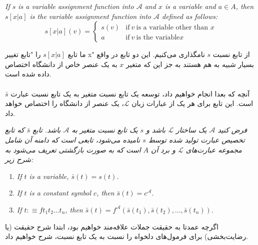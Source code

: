 \documentclass[10pt,a4paper]{article}
\newcommand{\curveL}{\mathcal{L}}
\newcommand{\curveA}{\mathcal{A}}
\begin{document}
                    \begin{define}
                        \textit{If $s$ is a variable assignment function into $\curveA$ and $x$ is a variable and $a\in A$, then $s[x|a]$ is the variable assignment function into $\curveA$ defined as follows:}
                        \begin{equation}
                            s[x|a](v) = \left\{
                                \begin{matrix}
                                    s(v) & \text{if} \ v \ \text{is a variable other than }x\\
                                    a & \text{if} \ v \ \text{is the variable} x 
                                \end{matrix}\right.
                        \end{equation}
                    \end{define} 
                 ما تابع $s[x|a]$ را "تابع تغییر x" از تابع نسبت $s$ نامگذاری می‌کنیم. این دو تابع در واقع بسیار شبیه به هم هستند به جز این که متغیر $x$ به یک عنصر خاص از دانشگاه اختصاص داده شده است.
                    \\
                    \\
                   آنچه که بعدا انجام خواهیم داد، توسعه یک تابع نسبت متغیر به یک تابع نسبت عبارت $\bar{s}$ است. این تابع برای هر یک از عبارات زبان $\curveL$، یک عنصر از دانشگاه را اختصاص خواهد داد.
                    \begin{define}
                        \textit{فرض کنید $\curveA$ یک ساختار $\curveL$ باشد و $s$ یک تابع نسبت متغیر به $\curveA$ باشد. تابع $\bar{s}$ که تابع تخصیص عبارت تولید شده توسط $s$ نامیده می‌شود، تابعی است که دامنه آن شامل مجموعه عبارت‌های $\curveL$ و برد آن $A$ است که به صورت بازگشتی تعریف می‌شود به شرح زیر:}
                        \begin{enumerate}
                            \item \textit{If $t$ is a variable, $\bar s(t) = s(t)$}.
                            \item \textit{If $t$ is a constant symbol $c$, then $\bar s(t)= c^\curveA$}.
                            \item \textit{If $t:\equiv ft_1t_2\dots t_n$, then $\bar s(t) = f^\curveA (\bar s(t_1),\bar s(t_2),\dots,\bar s(t_n))$}.
                        \end{enumerate}
                    \end{define}
                    اگرچه عمدتا به حقیقت جملات علاقه‌مند خواهیم بود، ابتدا شرح حقیقت (یا رضایت‌بخشی) برای فرمول‌های دلخواه را نسبت به یک تابع نسبت، شرح خواهیم داد.
\end{document}
